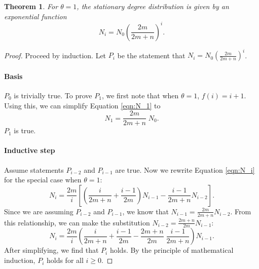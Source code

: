\documentclass[a4paper,10pt]{article}
\newtheorem{theorem}{Theorem}
\begin{document}
\begin{theorem}
 For $\theta=1$, the stationary degree distribution is given by an exponential function
 \begin{equation}
  N_i = N_0 \left(\frac{2m}{2m + n}\right)^i.
 \end{equation}
\end{theorem}
\begin{proof}
Proceed by induction. Let $P_i$ be the statement that $N_i = N_0 (\frac{2m}{2m+n})^i$.
\paragraph{Basis}
$P_0$ is trivially true. To prove $P_1$, we first note that when $\theta=1$, $f(i) = i + 1.$ Using this, we can simplify Equation \ref{eqn:N_1} to
 \begin{equation}
  N_{1} = \frac{2m}{2m + n} \; N_0.
 \end{equation}
$P_1$ is true.
\paragraph{Inductive step}
Assume statements $P_{i-2}$ and $P_{i-1}$ are true. Now we rewrite Equation \ref{eqn:N_i} for the special case when $\theta = 1$:
\begin{equation}
N_{i} = \frac{2m}{i}\left[\left( \frac{i}{2m + n} + \frac{i - 1}{2m} \right) N_{i - 1} -  \frac{i - 1}{2m + n} N_{i - 2}\right].
\end{equation}
Since we are assuming $P_{i-2}$ and $P_{i-1}$, we know that $N_{i - 1} = \frac{2m}{2m + n} N_{i - 2}$. From this relationship, we can make the substitution $N_{i - 2} = \frac{2m + n}{2m} N_{i - 1}$:
\begin{equation}
N_{i} = \frac{2m}{i}\left( \frac{i}{2m + n} + \frac{i - 1}{2m} - \frac{2m + n}{2m} \; \frac{i - 1}{2m + n}\right) N_{i - 1}.
\end{equation}
After simplifying, we find that $P_i$ holds. By the principle of mathematical induction, $P_i$ holds for all $i \geq 0$.

\end{proof}
\end{document}
